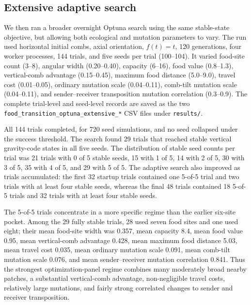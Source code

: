 \documentclass[11pt]{article}
\begin{document}
\subsection{Extensive adaptive search}

We then ran a broader overnight Optuna search using the same stable-state
objective, but allowing both ecological and mutation parameters to vary. The
run used horizontal initial combs, axial orientation, $f(t)=t$, 120 generations,
four worker processes, 144 trials, and five seeds per trial (100--104). It
varied food-site count (3--8), angular width (0.20--0.40), capacity (6--16),
food value (0.8--1.3), vertical-comb advantage (0.15--0.45), maximum food
distance (5.0--9.0), travel cost (0.01--0.05), ordinary mutation scale
(0.04--0.11), comb-tilt mutation scale (0.04--0.11), and sender--receiver
transposition mutation correlation (0.3--0.9). The complete trial-level and
seed-level records are saved as the two
\texttt{food\_transition\_optuna\_extensive\_*} CSV files under
\texttt{results/}.

All 144 trials completed, for 720 seed simulations, and no seed collapsed under
the success threshold. The search found 29 trials that reached stable vertical
gravity-code states in all five seeds. The distribution of stable seed counts
per trial was 21 trials with 0 of 5 stable seeds, 15 with 1 of 5, 14 with
2 of 5, 30 with 3 of 5, 35 with 4 of 5, and 29 with 5 of 5. The adaptive search
also improved as trials accumulated: the first 32 startup trials contained one
5-of-5 trial and two trials with at least four stable seeds, whereas the final
48 trials contained 18 5-of-5 trials and 32 trials with at least four stable
seeds.

The 5-of-5 trials concentrate in a more specific regime than the earlier
six-site pocket. Among the 29 fully stable trials, 28 used seven food sites and
one used eight; their mean food-site width was 0.357, mean capacity 8.4, mean
food value 0.95, mean vertical-comb advantage 0.428, mean maximum food distance
5.03, mean travel cost 0.035, mean ordinary mutation scale 0.091, mean
comb-tilt mutation scale 0.076, and mean sender--receiver mutation correlation
0.841. Thus the strongest optimization-panel regime combines many moderately
broad nearby patches, a substantial vertical-comb advantage, non-negligible
travel costs, relatively large mutations, and fairly strong correlated changes
to sender and receiver transposition.
\end{document}
